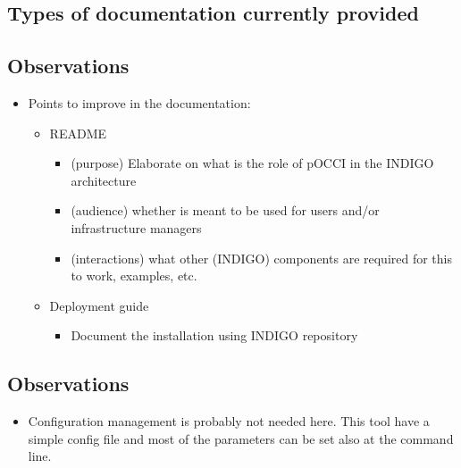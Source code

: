 \documentclass[a4wide,11pt]{article}
\begin{document}
\subsection{Types of documentation currently provided}
\begin{center}
\end{center}
\subsection{Observations}
\begin{itemize}
        \item Points to improve in the documentation: \begin{itemize} \item README \begin{itemize} \item (purpose) Elaborate on what is the role of pOCCI in the INDIGO architecture \item (audience) whether is meant to be used for users and/or infrastructure managers \item (interactions) what other (INDIGO) components are required for this to work, examples, etc. \end{itemize} \item Deployment guide \begin{itemize} \item Document the installation using INDIGO repository \end{itemize} \end{itemize}
    \end{itemize}



\label{sec:configuration}



\subsection{Observations}
\begin{itemize}
        \item Configuration management is probably not needed here. This tool have a simple config file and most of the parameters can be set also at the command line.
    \end{itemize}


\newpage

\end{document}

